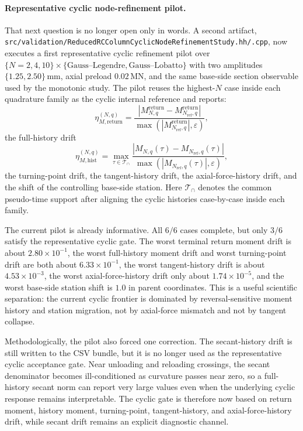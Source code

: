 \paragraph{Representative cyclic node-refinement pilot.}
That next question is no longer open only in words. A second artifact,
\texttt{src/validation/ReducedRCColumnCyclicNodeRefinementStudy.hh/.cpp},
now executes a first representative cyclic refinement pilot over
\(\{N=2,4,10\}\times\{\text{Gauss--Legendre},\text{Gauss--Lobatto}\}\)
with two amplitudes \(\{1.25,2.50\}\,\mathrm{mm}\), axial preload
\(0.02\,\mathrm{MN}\), and the same base-side section observable used by the
monotonic study. The pilot reuses the highest-\(N\) case inside each
quadrature family as the cyclic internal reference and reports:
\begin{equation}
  \eta_{M,\mathrm{return}}^{(N,q)}
  =
  \frac{|M_{N,q}^{\mathrm{return}}-
         M_{N_{\mathrm{ref}},q}^{\mathrm{return}}|}
       {\max(|M_{N_{\mathrm{ref}},q}^{\mathrm{return}}|,\varepsilon)},
\end{equation}
the full-history drift
\begin{equation}
  \eta_{M,\mathrm{hist}}^{(N,q)}
  =
  \max_{\tau \in \mathcal{T}_{\cap}}
  \frac{|M_{N,q}(\tau)-M_{N_{\mathrm{ref}},q}(\tau)|}
       {\max(|M_{N_{\mathrm{ref}},q}(\tau)|,\varepsilon)},
\end{equation}
the turning-point drift, the tangent-history drift, the axial-force-history
drift, and the shift of the controlling base-side station. Here
\(\mathcal{T}_{\cap}\) denotes the common pseudo-time support after aligning
the cyclic histories case-by-case inside each family.

The current pilot is already informative. All \(6/6\) cases complete, but
only \(3/6\) satisfy the representative cyclic gate. The worst terminal return
moment drift is about \(2.80\times 10^{-1}\), the worst full-history moment
drift and worst turning-point drift are both about \(6.33\times 10^{-1}\),
the worst tangent-history drift is about \(4.53\times 10^{-3}\), the worst
axial-force-history drift only about \(1.74\times 10^{-5}\), and the worst
base-side station shift is \(1.0\) in parent coordinates. This is a useful
scientific separation: the current cyclic frontier is dominated by
reversal-sensitive moment history and station migration, not by axial-force
mismatch and not by tangent collapse.

Methodologically, the pilot also forced one correction. The secant-history
drift is still written to the CSV bundle, but it is no longer used as the
representative cyclic acceptance gate. Near unloading and reloading
crossings, the secant denominator becomes ill-conditioned as curvature passes
near zero, so a full-history secant norm can report very large values even
when the underlying cyclic response remains interpretable. The cyclic gate is
therefore now based on return moment, history moment, turning-point,
tangent-history, and axial-force-history drift, while secant drift remains an
explicit diagnostic channel.

